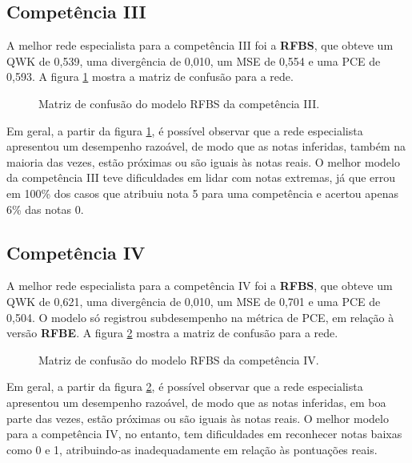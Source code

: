 \subsection{Competência III}
\label{subsec:eval-c3}

A melhor rede especialista para a competência III foi a \textbf{RFBS}, que obteve um QWK de 0,539, uma divergência de 0,010, um MSE de 0,554 e uma PCE de 0,593. A figura \ref{fig:eval-c3-confusion-matrix} mostra a matriz de confusão para a rede.

\begin{figure}[H]
    \centering
    \resizebox{0.5\textwidth}{!}{}
    \caption{Matriz de confusão do modelo RFBS da competência III.}
    \label{fig:eval-c3-confusion-matrix}
\end{figure}

Em geral, a partir da figura \ref{fig:eval-c3-confusion-matrix}, é possível observar que a rede especialista apresentou um desempenho razoável, de modo que as notas inferidas, também na maioria das vezes, estão próximas ou são iguais às notas reais. O melhor modelo da competência III teve dificuldades em lidar com notas extremas, já que errou em 100\% dos casos que atribuiu nota 5 para uma competência e acertou apenas 6\% das notas 0.

\subsection{Competência IV}
\label{subsec:eval-c4}

A melhor rede especialista para a competência IV foi a \textbf{RFBS}, que obteve um QWK de 0,621, uma divergência de 0,010, um MSE de 0,701 e uma PCE de 0,504. O modelo só registrou subdesempenho na métrica de PCE, em relação à versão \textbf{RFBE}. A figura \ref{fig:eval-c4-confusion-matrix} mostra a matriz de confusão para a rede.

\begin{figure}[H]
    \centering
    \resizebox{0.5\textwidth}{!}{}
    \caption{Matriz de confusão do modelo RFBS da competência IV.}
    \label{fig:eval-c4-confusion-matrix}
\end{figure}

Em geral, a partir da figura \ref{fig:eval-c4-confusion-matrix}, é possível observar que a rede especialista apresentou um desempenho razoável, de modo que as notas inferidas, em boa parte das vezes, estão próximas ou são iguais às notas reais. O melhor modelo para a competência IV, no entanto, tem dificuldades em reconhecer notas baixas como 0 e 1, atribuindo-as inadequadamente em relação às pontuações reais.

